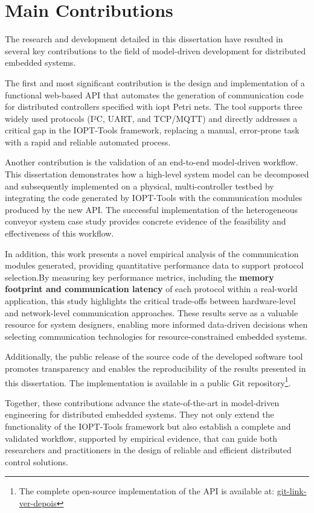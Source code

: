 \section{Main Contributions}
\label{sec:main_contributions}

The research and development detailed in this dissertation have resulted in several key contributions to the field of model-driven development for distributed embedded systems. 

The first and most significant contribution is the design and implementation of a functional web-based API that automates the generation of communication code for distributed controllers specified with \gls{iopt} Petri nets. The tool supports three widely used protocols (I²C, UART, and TCP/MQTT) and directly addresses a critical gap in the IOPT-Tools framework, replacing a manual, error-prone task with a rapid and reliable automated process.

Another contribution is the validation of an end-to-end model-driven workflow. This dissertation demonstrates how a high-level system model can be decomposed and subsequently implemented on a physical, multi-controller testbed by integrating the code generated by IOPT-Tools with the communication modules produced by the new API. The successful implementation of the heterogeneous conveyor system case study provides concrete evidence of the feasibility and effectiveness of this workflow.

In addition, this work presents a novel empirical analysis of the communication modules generated, providing quantitative performance data to support protocol selection.By measuring key performance metrics, including the \textbf{memory footprint and communication latency}  of each protocol within a real-world application, this study highlights the critical trade-offs between hardware-level and network-level communication approaches. These results serve as a valuable resource for system designers, enabling more informed data-driven decisions when selecting communication technologies for resource-constrained embedded systems.

Additionally, the public release of the source code of the developed software tool promotes transparency and enables the reproducibility of the results presented in this dissertation. The implementation is available in a public Git repository\footnote{The complete open-source implementation of the API is available at: \url{git-link-ver-depois}}.

Together, these contributions advance the state-of-the-art in model-driven engineering for distributed embedded systems. They not only extend the functionality of the IOPT-Tools framework but also establish a complete and validated workflow, supported by empirical evidence, that can guide both researchers and practitioners in the design of reliable and efficient distributed control solutions.


